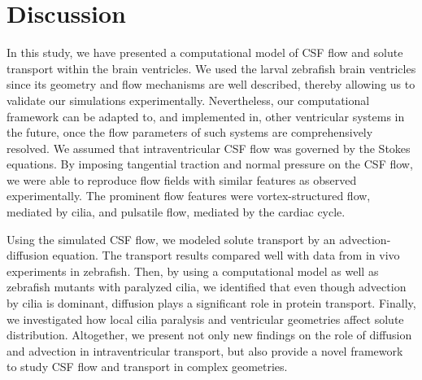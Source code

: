 \documentclass{WileyMSP-template}
\begin{document}
\section{Discussion}
In this study, we have presented a computational model of CSF flow and
solute transport within the brain ventricles.
We used the larval zebrafish brain ventricles since its geometry and
flow mechanisms are well described, thereby allowing us to validate
our simulations experimentally. Nevertheless, our computational framework can be adapted to,
and implemented in, other ventricular systems in the future, once the flow parameters of such systems
are comprehensively resolved. We assumed that intraventricular CSF flow was governed
by the Stokes equations.
By imposing tangential traction and normal pressure
on the CSF flow, we were able to reproduce flow fields with similar features
as observed experimentally. The prominent flow features were vortex-structured flow,
mediated by cilia, and pulsatile flow, mediated by the cardiac cycle.

Using the simulated CSF flow, we modeled solute transport by an advection-diffusion equation.
The transport results compared well with data from in vivo experiments in zebrafish.
Then, by using a computational model as well as zebrafish mutants with paralyzed cilia,
we identified that even though advection by cilia is dominant,
diffusion plays a significant role in protein transport.
Finally, we investigated how local cilia paralysis and ventricular geometries
affect solute distribution. Altogether, we present not only new findings on the role of
diffusion and advection in intraventricular transport, but also provide a novel framework to
study CSF flow and transport in complex geometries.
\end{document}
